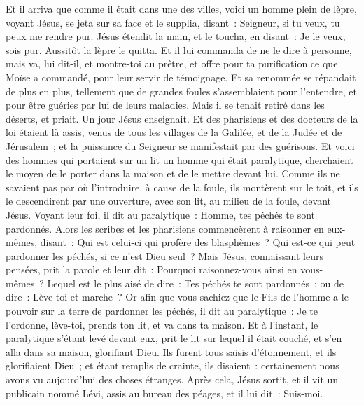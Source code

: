 \begin{multicols}{2}
Et il arriva que comme il était dans une des villes, voici un homme plein de lèpre, voyant Jésus, se jeta sur sa face et le supplia, disant~: Seigneur, si tu veux, tu peux me rendre pur.
Jésus étendit la main, et le toucha, en disant~: Je le veux, sois pur. Aussitôt la lèpre le quitta.
Et il lui commanda de ne le dire à personne, mais va, lui dit-il, et montre-toi au prêtre, et offre pour ta purification ce que Moïse a commandé, pour leur servir de témoignage.
Et sa renommée se répandait de plus en plus, tellement que de grandes foules s'assemblaient pour l'entendre, et pour être guéries par lui de leurs maladies.
Mais il se tenait retiré dans les déserts, et priait.
Un jour Jésus enseignait. Et des pharisiens et des docteurs de la loi étaient là assis, venus de tous les villages de la Galilée, et de la Judée et de Jérusalem~; et la puissance du Seigneur se manifestait par des guérisons.
Et voici des hommes qui portaient sur un lit un homme qui était paralytique, cherchaient le moyen de le porter dans la maison et de le mettre devant lui.
Comme ils ne savaient pas par où l'introduire, à cause de la foule, ils montèrent sur le toit, et ils le descendirent par une ouverture, avec son lit, au milieu de la foule, devant Jésus.
Voyant leur foi, il dit au paralytique~: Homme, tes péchés te sont pardonnés.
Alors les scribes et les pharisiens commencèrent à raisonner en eux-mêmes, disant~: Qui est celui-ci qui profère des blasphèmes~? Qui est-ce qui peut pardonner les péchés, si ce n'est Dieu seul~?
Mais Jésus, connaissant leurs pensées, prit la parole et leur dit~: Pourquoi raisonnez-vous ainsi en vous-mêmes~?
Lequel est le plus aisé de dire~: Tes péchés te sont pardonnés~; ou de dire~: Lève-toi et marche~?
Or afin que vous sachiez que le Fils de l'homme a le pouvoir sur la terre de pardonner les péchés, il dit au paralytique~: Je te l'ordonne, lève-toi, prends ton lit, et va dans ta maison.
Et à l'instant, le paralytique s'étant levé devant eux, prit le lit sur lequel il était couché, et s'en alla dans sa maison, glorifiant Dieu.
Ils furent tous saisis d'étonnement, et ils glorifiaient Dieu~; et étant remplis de crainte, ils disaient~: certainement nous avons vu aujourd'hui des choses étranges.
Après cela, Jésus sortit, et il vit un publicain nommé Lévi, assis au bureau des péages, et il lui dit~: Suis-moi.

\end{multicols}
